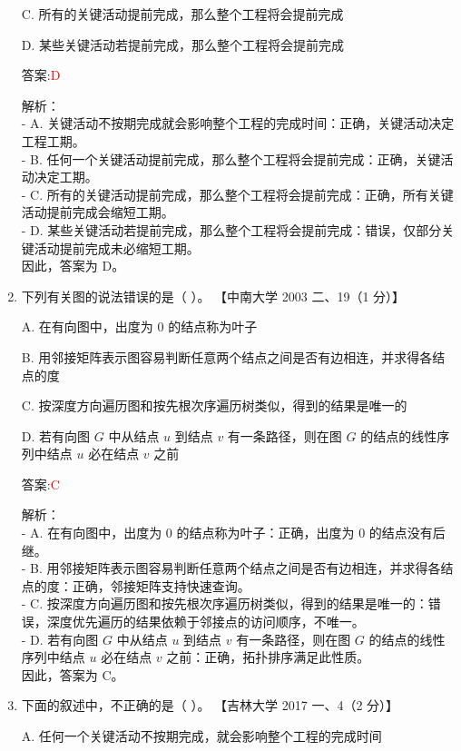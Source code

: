 \documentclass[lang=cn,newtx,10pt,scheme=chinese]{../../../elegantbook}
\begin{document}
\begin{enumerate}
    C. 所有的关键活动提前完成，那么整个工程将会提前完成  

    D. 某些关键活动若提前完成，那么整个工程将会提前完成  

    答案:\textcolor{red}{D}

    解析：\\
    - A. 关键活动不按期完成就会影响整个工程的完成时间：正确，关键活动决定工程工期。\\
    - B. 任何一个关键活动提前完成，那么整个工程将会提前完成：正确，关键活动决定工期。\\
    - C. 所有的关键活动提前完成，那么整个工程将会提前完成：正确，所有关键活动提前完成会缩短工期。\\
    - D. 某些关键活动若提前完成，那么整个工程将会提前完成：错误，仅部分关键活动提前完成未必缩短工期。\\
    因此，答案为 D。

\item 下列有关图的说法错误的是（ ）。  
    【中南大学 2003 二、19（1 分）】  

    A. 在有向图中，出度为 0 的结点称为叶子  

    B. 用邻接矩阵表示图容易判断任意两个结点之间是否有边相连，并求得各结点的度  

    C. 按深度方向遍历图和按先根次序遍历树类似，得到的结果是唯一的  

    D. 若有向图 $G$ 中从结点 $u$ 到结点 $v$ 有一条路径，则在图 $G$ 的结点的线性序列中结点 $u$ 必在结点 $v$ 之前  

    答案:\textcolor{red}{C}

    解析：\\
    - A. 在有向图中，出度为 0 的结点称为叶子：正确，出度为 0 的结点没有后继。\\
    - B. 用邻接矩阵表示图容易判断任意两个结点之间是否有边相连，并求得各结点的度：正确，邻接矩阵支持快速查询。\\
    - C. 按深度方向遍历图和按先根次序遍历树类似，得到的结果是唯一的：错误，深度优先遍历的结果依赖于邻接点的访问顺序，不唯一。\\
    - D. 若有向图 $G$ 中从结点 $u$ 到结点 $v$ 有一条路径，则在图 $G$ 的结点的线性序列中结点 $u$ 必在结点 $v$ 之前：正确，拓扑排序满足此性质。\\
    因此，答案为 C。

\item 下面的叙述中，不正确的是（ ）。  
    【吉林大学 2017 一、4（2 分）】  

    A. 任何一个关键活动不按期完成，就会影响整个工程的完成时间  


\end{enumerate}
\end{document}
